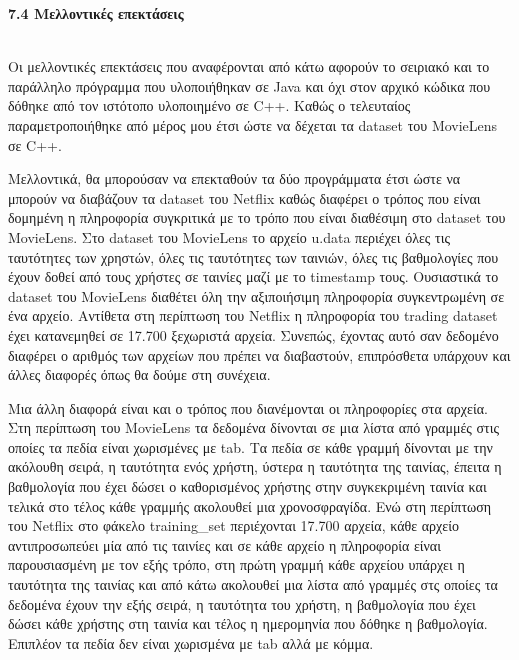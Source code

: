 \documentclass{report}
\begin{document}
{\vspace{20mm} 

\textbf{\large{7.4 Μελλοντικές επεκτάσεις}}

\vspace{2mm}
\\
Οι μελλοντικές επεκτάσεις που αναφέρονται από κάτω αφορούν το σειριακό και το παράλληλο πρόγραμμα που υλοποιήθηκαν σε \textlatin{Java} και όχι στον αρχικό κώδικα που δόθηκε από τον ιστότοπο υλοποιημένο σε \textlatin{C++}. Καθώς ο τελευταίος παραμετροποιήθηκε από μέρος μου έτσι ώστε να δέχεται τα \textlatin{dataset} του \textlatin{MovieLens} σε \textlatin{C++}. 

Μελλοντικά, θα μπορούσαν να επεκταθούν τα δύο προγράμματα έτσι ώστε να μπορούν να διαβάζουν τα \textlatin{dataset} του \textlatin{Netflix} καθώς διαφέρει ο τρόπος που είναι δομημένη η πληροφορία συγκριτικά με το τρόπο που είναι διαθέσιμη στο \textlatin{dataset} του \textlatin{MovieLens}. Στο \textlatin{dataset} του \textlatin{MovieLens} το αρχείο \textlatin{u.data} περιέχει όλες τις ταυτότητες των χρηστών, όλες τις ταυτότητες των ταινιών, όλες τις βαθμολογίες που έχουν δοθεί από τους χρήστες σε ταινίες μαζί με το \textlatin{timestamp} τους. Ουσιαστικά το \textlatin{dataset} του \textlatin{MovieLens} διαθέτει όλη την αξιποιήσιμη πληροφορία συγκεντρωμένη σε ένα αρχείο. Αντίθετα στη περίπτωση του \textlatin{Netflix} η πληροφορία του \textlatin{trading dataset} έχει κατανεμηθεί σε  17.700 ξεχωριστά αρχεία. Συνεπώς, έχοντας αυτό σαν δεδομένο διαφέρει ο αριθμός των αρχείων που πρέπει να διαβαστούν, επιπρόσθετα υπάρχουν και άλλες διαφορές όπως θα δούμε στη συνέχεια.

Μια άλλη διαφορά είναι και ο τρόπος που διανέμονται οι πληροφορίες στα αρχεία. Στη περίπτωση του \textlatin{MovieLens} τα δεδομένα δίνονται σε μια λίστα από γραμμές στις οποίες τα πεδία είναι χωρισμένες με \textlatin{tab}. Τα πεδία σε κάθε γραμμή δίνονται με την ακόλουθη σειρά, η ταυτότητα ενός χρήστη, ύστερα η ταυτότητα της ταινίας, έπειτα η βαθμολογία που έχει δώσει ο καθορισμένος χρήστης στην συγκεκριμένη ταινία και τελικά στο τέλος κάθε γραμμής ακολουθεί μια χρονοσφραγίδα. Ενώ στη περίπτωση του \textlatin{Netflix} στο φάκελο \textlatin{training\_set} περιέχονται 17.700 αρχεία, κάθε αρχείο αντιπροσωπεύει μία από τις ταινίες και σε κάθε αρχείο η πληροφορία είναι παρουσιασμένη με τον εξής τρόπο, στη πρώτη γραμμή κάθε αρχείου υπάρχει η ταυτότητα της ταινίας και από κάτω ακολουθεί μια λίστα από γραμμές στς οποίες τα δεδομένα έχουν την εξής σειρά, η ταυτότητα του χρήστη, η βαθμολογία που έχει δώσει κάθε χρήστης στη ταινία και τέλος η ημερομηνία που δόθηκε η βαθμολογία. Επιπλέον τα πεδία δεν είναι χωρισμένα με \textlatin{tab} αλλά με κόμμα.


}
\end{document}

